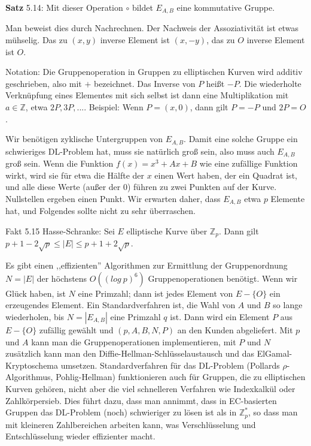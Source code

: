 \documentclass[a4paper]{article}
\begin{document}
\begin{multicols}{3}
    \textbf{Satz} 5.14: Mit dieser Operation $\circ$ bildet $E_{A,B}$ eine kommutative Gruppe.

    Man beweist dies durch Nachrechnen. Der Nachweis der Assoziativität ist etwas mühselig. Das zu $(x,y)$ inverse Element ist $(x,-y)$, das zu $O$ inverse Element ist $O$.

    Notation: Die Gruppenoperation in Gruppen zu elliptischen Kurven wird additiv geschrieben, also mit $+$ bezeichnet. Das Inverse von $P$ heißt $-P$. Die wiederholte Verknüpfung eines Elementes mit sich selbst ist dann eine Multiplikation mit $a\in\mathbb{Z}$, etwa $2P, 3P,...$.
    Beispiel: Wenn $P=(x,0)$, dann gilt $P=-P$ und $2P=O$.

    Wir benötigen zyklische Untergruppen von $E_{A,B}$. Damit eine solche Gruppe ein schwieriges DL-Problem hat, muss sie natürlich groß sein, also muss auch $E_{A,B}$ groß sein. Wenn die Funktion $f(x) =x^3+Ax+B$ wie eine zufällige Funktion wirkt, wird sie für etwa die Hälfte der $x$ einen Wert haben, der ein Quadrat ist, und alle diese Werte (außer der $0$) führen zu zwei Punkten auf der Kurve. Nullstellen ergeben einen Punkt. Wir erwarten daher, dass $E_{A,B}$ etwa $p$ Elemente hat, und Folgendes sollte nicht zu sehr überraschen.

    Fakt 5.15 Hasse-Schranke: Sei $E$ elliptische Kurve über $\mathbb{Z}_p$. Dann gilt $p+ 1- 2\sqrt{p}\leq |E|\leq p+1 + 2\sqrt{p}$.

    Es gibt einen ,,effizienten'' Algorithmen zur Ermittlung der Gruppenordnung $N=|E|$ der höchstens $O((log\ p)^6)$ Gruppenoperationen benötigt. Wenn wir Glück haben, ist $N$ eine Primzahl; dann ist jedes Element von $E-\{O\}$ ein erzeugendes Element. Ein Standardverfahren ist, die Wahl von $A$ und $B$ so lange wiederholen, bis $N=|E_{A,B}|$ eine Primzahl $q$ ist. Dann wird ein Element $P$ aus $E-\{O\}$ zufällig gewählt und $(p,A,B,N,P)$ an den Kunden abgeliefert. Mit $p$ und $A$ kann man die Gruppenoperationen implementieren, mit $P$ und $N$ zusätzlich kann man den Diffie-Hellman-Schlüsselaustausch und das ElGamal-Kryptoschema umsetzen.
    Standardverfahren für das DL-Problem (Pollards ${\rho}$-Algorithmus, Pohlig-Hellman) funktionieren auch für Gruppen, die zu elliptischen Kurven gehören, nicht aber die viel schnelleren Verfahren wie Indexkalkül oder Zahlkörpersieb. Dies führt dazu, dass man annimmt, dass in EC-basierten Gruppen das DL-Problem (noch) schwieriger zu lösen ist als in $\mathbb{Z}^*_p$, so dass man mit kleineren Zahlbereichen arbeiten kann, was Verschlüsselung und Entschlüsselung wieder effizienter macht.


\end{multicols}
\end{document}
